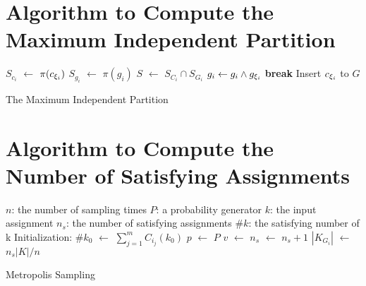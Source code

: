 
\section{Algorithm to Compute the Maximum Independent Partition}
\label{appendix:partition}


\IncMargin{1em}
\begin{algorithm}[h]
      \DontPrintSemicolon
      {
            $S_{c_i}$ $\leftarrow$ $\pi(c_{{\xi}_{i}})$ \;
            {
                  $S_{g_i}$ $\leftarrow$ $\pi(g_{i})$ \;
                  $S$ $\leftarrow$ $S_{C_i} \cap S_{G_i}$  \;
                  {
                        $g_{i} \leftarrow g_{i} \land g_{{\xi}_{i}}$ \;
                        \textbf{break} \;
                  }
                  Insert $c_{{\xi}_{i}}$ to $G$
            }
      }
      \caption{The Maximum Independent Partition}
      \label{algo:max-inde}
\end{algorithm}
\DecMargin{1em}

\section{Algorithm to Compute the Number of Satisfying Assignments}
\label{appendix:montecarlo}

\IncMargin{1em}
\begin{algorithm}
      \SetAlgoLined
      \DontPrintSemicolon


      $n$: the number of sampling times \;
      $P$: a probability generator \;
      $k$: the input assignment \;
      $n_{s}$: the number of satisfying assignments \;
      $\#k$: the satisfying number of k  \;
      Initialization: \;
      $\#{k_0}$ $\leftarrow$ $\sum_{j=1}^{m}C_{i_j}(k_0)$ \;
       {
            $p$ $\leftarrow$ $P$ \;
            {
                  $v$ $\leftarrow$  {}
            }
            {$n_{s}$ $\leftarrow$ $n_{s} + 1$}
      }
      $|K_{G_{i}}|$ $\leftarrow$ $n_s|K| / n$
      \caption{Metropolis Sampling}
\end{algorithm}
\DecMargin{1em}




